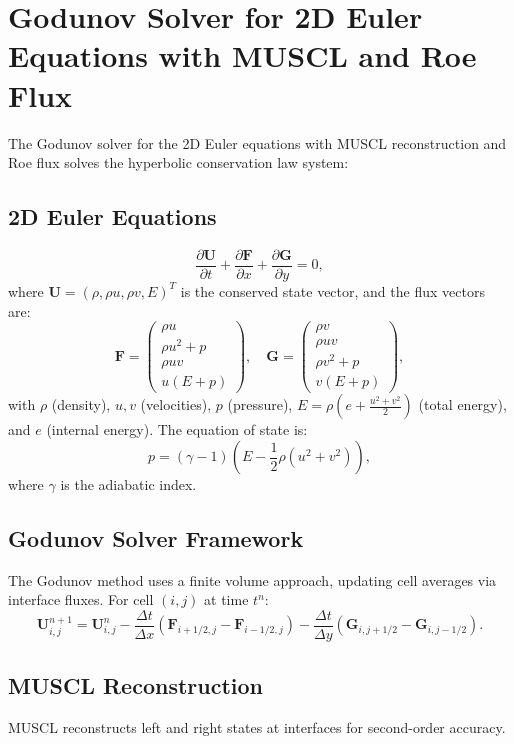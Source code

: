 \documentclass[a4paper,12pt]{article}
\begin{document}
\section*{Godunov Solver for 2D Euler Equations with MUSCL and Roe Flux}

The Godunov solver for the 2D Euler equations with MUSCL reconstruction and Roe flux solves the hyperbolic conservation law system:

\subsection*{2D Euler Equations}
\[
\frac{\partial \mathbf{U}}{\partial t} + \frac{\partial \mathbf{F}}{\partial x} + \frac{\partial \mathbf{G}}{\partial y} = 0,
\]
where \(\mathbf{U} = (\rho, \rho u, \rho v, E)^T\) is the conserved state vector, and the flux vectors are:
\[
\mathbf{F} = \begin{pmatrix} \rho u \\ \rho u^2 + p \\ \rho u v \\ u (E + p) \end{pmatrix}, \quad \mathbf{G} = \begin{pmatrix} \rho v \\ \rho u v \\ \rho v^2 + p \\ v (E + p) \end{pmatrix},
\]
with \(\rho\) (density), \(u, v\) (velocities), \(p\) (pressure), \(E = \rho \left( e + \frac{u^2 + v^2}{2} \right)\) (total energy), and \(e\) (internal energy). The equation of state is:
\[
p = (\gamma - 1) \left( E - \frac{1}{2} \rho (u^2 + v^2) \right),
\]
where \(\gamma\) is the adiabatic index.

\subsection*{Godunov Solver Framework}
The Godunov method uses a finite volume approach, updating cell averages via interface fluxes. For cell \((i,j)\) at time \(t^n\):
\[
\mathbf{U}_{i,j}^{n+1} = \mathbf{U}_{i,j}^n - \frac{\Delta t}{\Delta x} \left( \mathbf{F}_{i+1/2,j} - \mathbf{F}_{i-1/2,j} \right) - \frac{\Delta t}{\Delta y} \left( \mathbf{G}_{i,j+1/2} - \mathbf{G}_{i,j-1/2} \right).
\]

\subsection*{MUSCL Reconstruction}
MUSCL reconstructs left and right states at interfaces for second-order accuracy.
\end{document}
